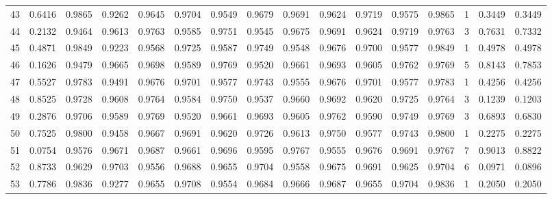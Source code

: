 \begin{tabular}{lrrrrrrrrrrrrrrr}
43  &      0.6416 &  0.9865 &  0.9262 &  0.9645 &  0.9704 &  0.9549 &  0.9679 &  0.9691 &  0.9624 &  0.9719 &   0.9575 &     0.9865 &      1 &                    0.3449 &                     0.3449 \\
44  &      0.2132 &  0.9464 &  0.9613 &  0.9763 &  0.9585 &  0.9751 &  0.9545 &  0.9675 &  0.9691 &  0.9624 &   0.9719 &     0.9763 &      3 &                    0.7631 &                     0.7332 \\
45  &      0.4871 &  0.9849 &  0.9223 &  0.9568 &  0.9725 &  0.9587 &  0.9749 &  0.9548 &  0.9676 &  0.9700 &   0.9577 &     0.9849 &      1 &                    0.4978 &                     0.4978 \\
46  &      0.1626 &  0.9479 &  0.9665 &  0.9698 &  0.9589 &  0.9769 &  0.9520 &  0.9661 &  0.9693 &  0.9605 &   0.9762 &     0.9769 &      5 &                    0.8143 &                     0.7853 \\
47  &      0.5527 &  0.9783 &  0.9491 &  0.9676 &  0.9701 &  0.9577 &  0.9743 &  0.9555 &  0.9676 &  0.9701 &   0.9577 &     0.9783 &      1 &                    0.4256 &                     0.4256 \\
48  &      0.8525 &  0.9728 &  0.9608 &  0.9764 &  0.9584 &  0.9750 &  0.9537 &  0.9660 &  0.9692 &  0.9620 &   0.9725 &     0.9764 &      3 &                    0.1239 &                     0.1203 \\
49  &      0.2876 &  0.9706 &  0.9589 &  0.9769 &  0.9520 &  0.9661 &  0.9693 &  0.9605 &  0.9762 &  0.9590 &   0.9749 &     0.9769 &      3 &                    0.6893 &                     0.6830 \\
50  &      0.7525 &  0.9800 &  0.9458 &  0.9667 &  0.9691 &  0.9620 &  0.9726 &  0.9613 &  0.9750 &  0.9577 &   0.9743 &     0.9800 &      1 &                    0.2275 &                     0.2275 \\
51  &      0.0754 &  0.9576 &  0.9671 &  0.9687 &  0.9661 &  0.9696 &  0.9595 &  0.9767 &  0.9555 &  0.9676 &   0.9691 &     0.9767 &      7 &                    0.9013 &                     0.8822 \\
52  &      0.8733 &  0.9629 &  0.9703 &  0.9556 &  0.9688 &  0.9655 &  0.9704 &  0.9558 &  0.9675 &  0.9691 &   0.9625 &     0.9704 &      6 &                    0.0971 &                     0.0896 \\
53  &      0.7786 &  0.9836 &  0.9277 &  0.9655 &  0.9708 &  0.9554 &  0.9684 &  0.9666 &  0.9687 &  0.9655 &   0.9704 &     0.9836 &      1 &                    0.2050 &                     0.2050 \\

\end{tabular}
